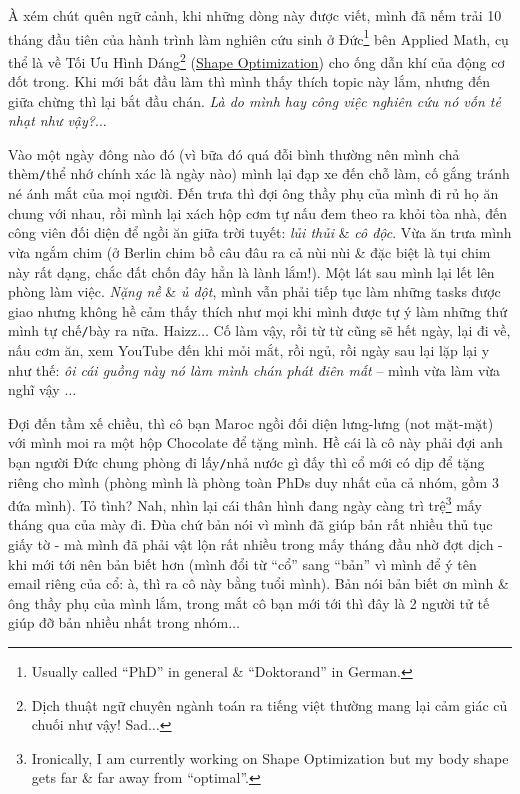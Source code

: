 \documentclass[12pt,twoside]{book}
\begin{document}
À xém chút quên ngữ cảnh, khi những dòng này được viết, mình đã nếm trải 10 tháng đầu tiên của hành trình làm nghiên cứu sinh ở Đức\footnote{Usually called ``PhD'' in general \& ``Doktorand'' in German.} bên Applied Math, cụ thể là về Tối Ưu Hình Dáng\footnote{Dịch thuật ngữ chuyên ngành toán ra tiếng việt thường mang lại cảm giác củ chuối như vậy! Sad$\ldots$} (\href{https://en.wikipedia.org/wiki/Shape_optimization}{Shape Optimization}) cho ống dẫn khí của động cơ đốt trong. Khi mới bắt đầu làm thì mình thấy thích topic này lắm, nhưng đến giữa chừng thì lại bắt đầu chán. {\it Là do mình hay công việc nghiên cứu nó vốn tẻ nhạt như vậy?}$\ldots$

Vào một ngày đông nào đó (vì bữa đó quá đỗi bình thường nên mình chả thèm{\tt/}thể nhớ chính xác là ngày nào) mình lại đạp xe đến chỗ làm, cố gắng tránh né ánh mắt của mọi người. Đến trưa thì đợi ông thầy phụ của mình đi rủ họ ăn chung với nhau, rồi mình lại xách hộp cơm tự nấu đem theo ra khỏi tòa nhà, đến công viên đối diện để ngồi ăn giữa trời tuyết: {\it lủi thủi} \& {\it cô độc}. Vừa ăn trưa mình vừa ngắm chim (ở Berlin chim bồ câu đâu ra cả nùi nùi \& đặc biệt là tụi chim này rất dạng, chắc đất chốn đây hẳn là lành lắm!). Một lát sau mình lại lết lên phòng làm việc. {\it Nặng nề} \& {\it ủ dột}, mình vẫn phải tiếp tục làm những tasks được giao nhưng không hề cảm thấy thích như mọi khi mình được tự ý làm những thứ mình tự chế{\tt/}bày ra nữa. Haizz$\ldots$ Cố làm vậy, rồi từ từ cũng sẽ hết ngày, lại đi về, nấu cơm ăn, xem YouTube đến khi mỏi mắt, rồi ngủ, rồi ngày sau lại lặp lại y như thế: {\it ôi cái guồng này nó làm mình chán phát điên mất} -- mình vừa làm vừa nghĩ vậy $\ldots$

Đợi đến tầm xế chiều, thì cô bạn Maroc ngồi đối diện lưng-lưng (not mặt-mặt) với mình moi ra một hộp Chocolate để tặng mình. Hề cái là cô này phải đợi anh bạn người Đức chung phòng đi lấy{\tt/}nhả nước gì đấy thì cổ mới có dịp để tặng riêng cho mình (phòng mình là phòng toàn PhDs duy nhất của cả nhóm, gồm 3 đứa mình). Tỏ tình? Nah, nhìn lại cái thân hình đang ngày càng trì trệ\footnote{Ironically, I am currently working on Shape Optimization but my body shape gets far \& far away from ``optimal''.} mấy tháng qua của mày đi. Đùa chứ bản nói vì mình đã giúp bản rất nhiều thủ tục giấy tờ - mà mình đã phải vật lộn rất nhiều trong mấy tháng đầu nhờ đợt dịch - khi mới tới nên bản biết hơn (mình đổi từ ``cổ'' sang ``bản'' vì mình để ý tên email riêng của cổ: à, thì ra cô này bằng tuổi mình). Bản nói bản biết ơn mình \& ông thầy phụ của mình lắm, trong mắt cô bạn mới tới thì đây là 2 người tử tế giúp đỡ bản nhiều nhất trong nhóm$\ldots$
\end{document}
